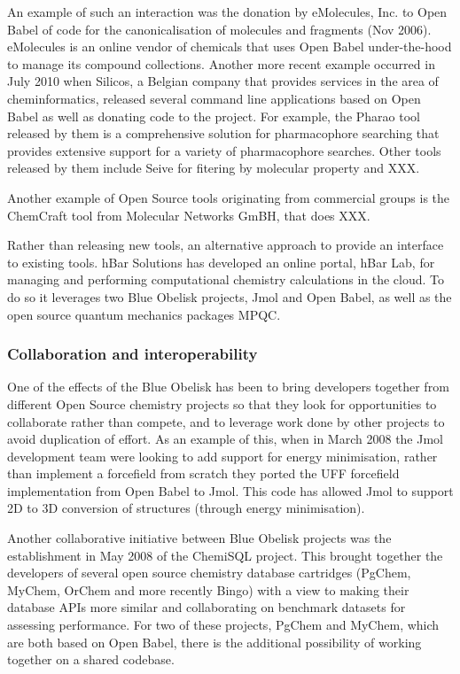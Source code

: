 \documentclass[10pt]{bmc_article}
\newenvironment{bmcformat}{\begin{raggedright}\baselineskip20pt\sloppy\setboolean{publ}{false}}{\end{raggedright}\baselineskip20pt\sloppy}
\begin{document}
\begin{bmcformat}
An example of such an interaction was the donation by eMolecules, Inc. to Open Babel of code for the canonicalisation of molecules and fragments (Nov 2006). eMolecules is an online vendor of chemicals that uses Open Babel under-the-hood to manage its compound collections. Another more recent example occurred in July 2010 when Silicos, a Belgian company that provides services
in the area of cheminformatics, released several command line applications based on Open Babel as well as donating code to the project. For example, the Pharao
tool released by them is a comprehensive solution for pharmacophore
searching that provides extensive support for a variety of
pharmacophore searches. Other tools released by them include Seive for
fitering by molecular property and XXX.

Another example of Open Source
tools originating from commercial groups is the ChemCraft tool from
Molecular Networks GmBH, that does XXX.

Rather than releasing new tools, an alternative approach to provide an interface to existing tools. hBar Solutions has developed an online portal, hBar Lab, for managing and performing computational chemistry calculations in the cloud. To do so it leverages two Blue Obelisk projects, Jmol and Open Babel, as well as the open source quantum mechanics packages MPQC.

  \subsubsection*{Collaboration and interoperability}

One of the effects of the Blue Obelisk has been to bring developers together from different Open Source chemistry projects so that they look for opportunities to collaborate rather than compete, and to leverage work done by other projects to avoid duplication of effort. As an example of this, when in March 2008 the Jmol development team were looking to add support for energy minimisation, rather than implement a forcefield from scratch they ported the UFF forcefield implementation from Open Babel to Jmol. This code has allowed Jmol to support 2D to 3D conversion of structures (through energy minimisation).

Another collaborative initiative between Blue Obelisk projects was the establishment in May 2008 of
the ChemiSQL project. This brought together the developers of several
open source chemistry database cartridges (PgChem, MyChem, OrChem and
more recently Bingo) with a view to making their database APIs more
similar and collaborating on benchmark datasets for assessing
performance. For two of these projects, PgChem and MyChem, which are both based on
Open Babel, there is the additional possibility of working together on a shared
codebase.


\end{bmcformat}
\end{document}
